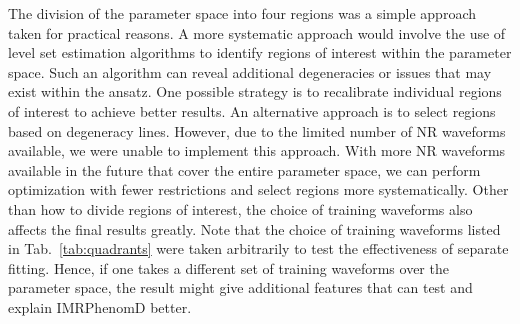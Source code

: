 \documentclass[twocolumn]{aastex631}
\newcommand{\ripple}{\texttt{ripple}}
\newcommand{\jax}{\texttt{jax}}
\newcommand{\zdethp}{\texttt{zdethp}}
\begin{document}
The division of the parameter space into four regions was a simple approach
taken for practical reasons. A more systematic approach would involve the use of
level set estimation algorithms to identify regions of interest within the
parameter space. Such an algorithm can reveal additional degeneracies or issues
that may exist within the ansatz. One possible strategy is to recalibrate
individual regions of interest to achieve better results. An alternative
approach is to select regions based on degeneracy lines. However, due to the
limited number of NR waveforms available, we were unable to implement this
approach. With more NR waveforms available in the future that cover the entire
parameter space, we can perform optimization with fewer restrictions and select
regions more systematically. Other than how to divide regions of interest, the 
choice of training waveforms also affects the final results greatly. Note that 
the choice of training waveforms listed in Tab.~\ref{tab:quadrants} were taken 
arbitrarily to test the effectiveness of separate fitting. Hence, if one takes 
a different set of training waveforms over the parameter space, the result might 
give additional features that can test and explain IMRPhenomD better. 



\end{document}
